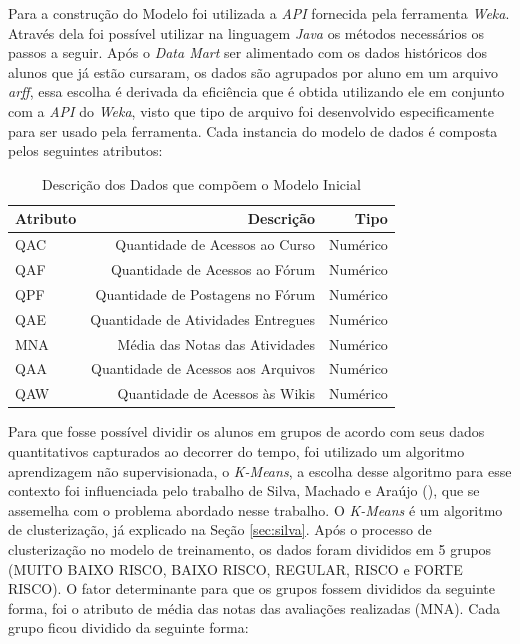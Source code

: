 \label{sec:modelo}

Para a construção do Modelo foi utilizada a \textit{API} fornecida pela ferramenta \textit{Weka}. Através dela foi possível utilizar na linguagem \textit{Java} os métodos necessários os passos a seguir. Após o \textit{Data Mart} ser alimentado com os dados históricos dos alunos que já estão cursaram, os dados são agrupados por aluno em um arquivo \textit{arff}, essa escolha é derivada da eficiência que é obtida utilizando ele em conjunto com a \textit{API} do \textit{Weka}, visto que tipo de arquivo foi desenvolvido especificamente para ser usado pela ferramenta. Cada instancia do modelo de dados é composta pelos seguintes atributos:

\begin{table}[!ht]
\centering
\caption{Descrição dos Dados que compõem o Modelo Inicial}
\vspace{0.5cm}
\begin{tabular}{l|r|r|}
 
Atributo & Descrição & Tipo\\
\hline
QAC & Quantidade de Acessos ao Curso& Numérico\\
QAF & Quantidade de Acessos ao Fórum& Numérico\\
QPF & Quantidade de Postagens no Fórum& Numérico\\
QAE & Quantidade de Atividades Entregues& Numérico\\
MNA & Média das Notas das Atividades& Numérico\\
QAA & Quantidade de Acessos aos Arquivos& Numérico\\
QAW & Quantidade de Acessos às Wikis& Numérico
\end{tabular}
\label{tab:modelo_inicial}
\end{table}

Para que fosse possível dividir os alunos em grupos de acordo com seus dados quantitativos capturados ao decorrer do tempo, foi utilizado um algoritmo aprendizagem não supervisionada, o \textit{K-Means}, a escolha desse algoritmo para esse contexto foi influenciada pelo trabalho de  Silva, Machado e Araújo (\citeyear{silva2014sistema}), que se assemelha com o problema abordado nesse trabalho. O \textit{K-Means} é um algoritmo de clusterização, já explicado na Seção \ref{sec:silva}. Após o processo de clusterização no modelo de treinamento, os dados foram divididos em 5 grupos (MUITO BAIXO RISCO, BAIXO RISCO, REGULAR, RISCO e FORTE RISCO). O fator determinante para que os grupos fossem divididos da seguinte forma, foi o atributo de média das notas das avaliações realizadas (MNA). Cada grupo ficou dividido da seguinte forma:

